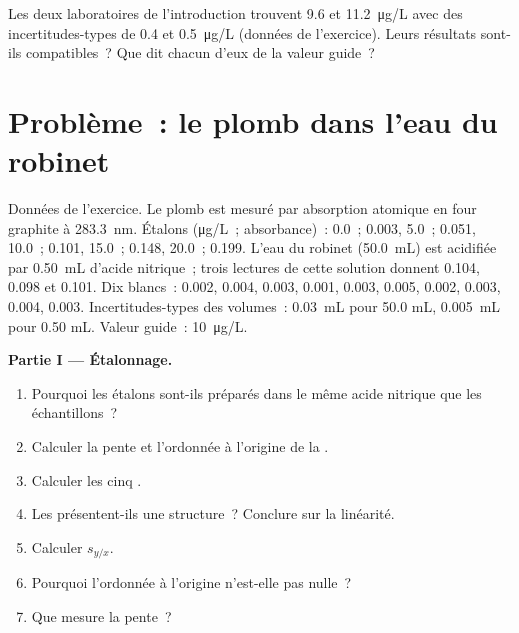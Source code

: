 \begin{exercise}[$\star\star\star$]\label{exo:b2:measurement-statistics:12}
Les deux laboratoires de l'introduction trouvent 9.6 et \qty{11.2}{\micro g/L} avec des incertitudes-types
de 0.4 et \qty{0.5}{\micro g/L} (données de l'exercice). Leurs résultats sont-ils compatibles~? Que dit
chacun d'eux de la valeur guide~?
\end{exercise}

\section{Problème~: le plomb dans l'eau du robinet}

\begin{problem}
\label{pb:b2:measurement-statistics:1}
Données de l'exercice. Le plomb est mesuré par absorption atomique en four graphite à \qty{283.3}{nm}.
Étalons (\unit{\micro g/L}~; absorbance)~: 0.0~; 0.003, 5.0~; 0.051, 10.0~; 0.101, 15.0~; 0.148, 20.0~;
0.199. L'eau du robinet (\qty{50.0}{mL}) est acidifiée par \qty{0.50}{mL} d'acide nitrique~; trois
lectures de cette solution donnent 0.104, 0.098 et 0.101. Dix blancs~: 0.002, 0.004, 0.003, 0.001,
0.003, 0.005, 0.002, 0.003, 0.004, 0.003. Incertitudes-types des volumes~: \qty{0.03}{mL} pour 50.0 mL,
\qty{0.005}{mL} pour 0.50 mL. Valeur guide~: \qty{10}{\micro g/L}.

\medskip
\noindent\textbf{Partie I --- Étalonnage.}
\begin{enumerate}
  \item Pourquoi les étalons sont-ils préparés dans le même acide nitrique que les échantillons~?
  \item Calculer la pente et l'ordonnée à l'origine de la .
  \item Calculer les cinq .
  \item Les  présentent-ils une structure~? Conclure sur la linéarité.
  \item Calculer $s_{y/x}$.
  \item Pourquoi l'ordonnée à l'origine n'est-elle pas nulle~?
  \item Que mesure la pente~?
\end{enumerate}


\end{problem}
